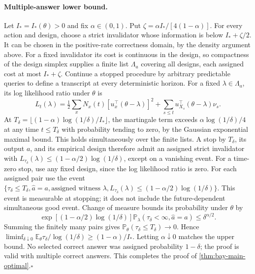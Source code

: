 \documentclass{article}
\theoremstyle{plain}
\theoremstyle{definition}
\begin{document}
\paragraph{Multiple-answer lower bound.}
Let $I_*=I_*(\theta)>0$ and fix $\alpha\in(0,1)$.  Put
$\zeta=\alpha I_*/[4(1-\alpha)]$.  For every action and design, choose
a strict invalidator whose information is below $I_*+\zeta/2$.
It can be chosen in the positive-rate correctness domain, by the density
argument above.  For a fixed invalidator its cost is continuous in the
design, so compactness of the design simplex supplies a finite list
$\Lambda_a$ covering all designs, each assigned cost at most
$I_*+\zeta$.  Continue a stopped procedure by arbitrary predictable
queries to define a transcript at every deterministic horizon.
For a fixed $\lambda\in\Lambda_a$, its log likelihood ratio under
$\theta$ is
\[
 L_t(\lambda)=\tfrac12\sum_xN_x(t)[u_x^\top(\theta-\lambda)]^2
       +\sum_{s\le t}u_{X_s}^\top(\theta-\lambda)\nu_s.
\]
At $T_\delta=\lfloor(1-\alpha)\log(1/\delta)/I_*\rfloor$, the
martingale term exceeds $\alpha\log(1/\delta)/4$ at any time
$t\le T_\delta$ with probability tending to zero, by the Gaussian
exponential maximal bound.  This holds simultaneously over the finite
lists.  A stop by $T_\delta$, its output $a$, and its empirical design
therefore admit an assigned strict invalidator with
$L_{\tau_\delta}(\lambda)\le(1-\alpha/2)\log(1/\delta)$, except
on a vanishing event.  For a time-zero stop, use any fixed design, since
the log likelihood ratio is zero.  For each assigned pair use the event
$\{\tau_\delta\le T_\delta,\widehat a=a,\text{assigned witness }\lambda,
L_{\tau_\delta}(\lambda)\le(1-\alpha/2)\log(1/\delta)\}$.
This event is measurable at stopping; it does not include the
future-dependent simultaneous good event.  Change of measure bounds its
probability under $\theta$ by
\[
 \exp[(1-\alpha/2)\log(1/\delta)]
       \mathbb P_\lambda(\tau_\delta<\infty,\widehat a=a)
 \le\delta^{\alpha/2}.
\]
Summing the finitely many pairs gives
$\mathbb P_\theta(\tau_\delta\le T_\delta)\to0$.
Hence $\liminf_{\delta\downarrow0}\mathbb E_\theta\tau_\delta/
\log(1/\delta)\ge(1-\alpha)/I_*$.  Letting $\alpha\downarrow0$
matches the upper bound.  No selected correct answer was assigned
probability $1-\delta$; the proof is valid with multiple correct answers.
This completes the proof of \cref{thm:bay-main-optimal}.\hfill$\square$
\end{document}
